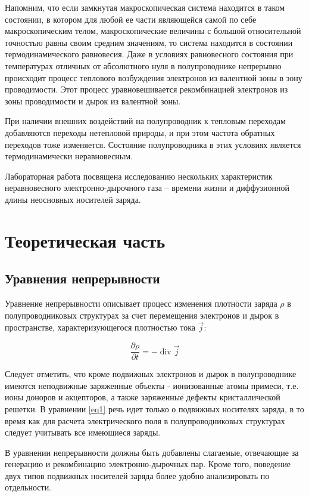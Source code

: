 Напомним, что если замкнутая макроскопическая система находится в таком состоянии, в котором для любой ее части
являющейся самой по себе макроскопическим телом, макроскопические величины с большой относительной точностью равны своим
средним значениям, то система находится в состоянии термодинамического равновесия. Даже в условиях
равновесного состояния при температурах отличных от абсолютного нуля в полупроводнике непрерывно происходит процесс
теплового возбуждения электронов из валентной зоны в зону проводимости. Этот процесс уравновешивается рекомбинацией
электронов из зоны проводимости и дырок из валентной зоны.

При наличии внешних воздействий на полупроводник к тепловым переходам добавляются переходы нетепловой природы, и при
этом частота обратных переходов тоже изменяется. Состояние полупроводника в этих условиях является термодинамически
неравновесным.

Лабораторная работа посвящена исследованию нескольких характеристик неравновесного электронно-дырочного газа -- времени
жизни и диффузионной длины неосновных носителей заряда.

\section{Теоретическая часть}
\subsection{Уравнения непрерывности}

Уравнение непрерывности описывает процесс изменения плотности заряда $\rho$ в полупроводниковых структурах за счет
перемещения электронов и дырок в пространстве, характеризующегося плотностью тока $\vec{j}$:

\begin{equation}
	\label{eq1}
	\frac{\partial \rho}{\partial t}=-\operatorname{div} \vec{j}
\end{equation}

Следует отметить, что кроме подвижных электронов и дырок в полупроводнике имеются неподвижные заряженные объекты -
ионизованные атомы примеси, т.е. ионы доноров и акцепторов, а также заряженные дефекты кристаллической решетки. В
уравнении \eqref{eq1} речь идет только о подвижных носителях заряда, в то время как для расчета электрического поля в
полупроводниковых структурах следует учитывать все имеющиеся заряды.

В уравнении непрерывности должны быть добавлены слагаемые, отвечающие за генерацию и рекомбинацию электронно-дырочных пар. Кроме того, поведение
двух типов подвижных носителей заряда более удобно анализировать по отдельности.

